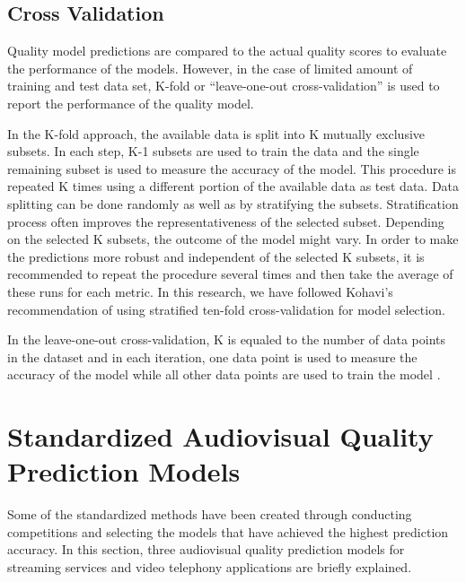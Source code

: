 \documentclass[journal]{IEEEtran}
\begin{document}
\subsection{Cross Validation}
\label{subsec:CrossVal}

Quality model predictions are compared to the actual quality scores to evaluate the performance of the models. However, in the case of limited amount of training and test data set, K-fold or ``leave-one-out cross-validation'' is used to report the performance of the quality model.

In the K-fold approach, the available data is split into K mutually exclusive subsets. In each step, K-1 subsets are used to train the data and the single remaining subset is used to measure the accuracy of the model. This procedure is repeated K times using a different portion of the available data as test data. Data splitting can be done randomly as well as by stratifying the subsets. Stratification process often improves the representativeness of the selected subset. Depending on the selected K subsets, the outcome of the model might vary. In order to make the predictions more robust and independent of the selected K subsets, it is recommended to repeat the procedure several times and then take the average of these runs for each metric. In this research, we have followed Kohavi's \cite{kohavi1995study} recommendation of using stratified ten-fold cross-validation for model selection.

In the leave-one-out cross-validation, K is equaled to the number of data points in the dataset and in each iteration, one data point is used to measure the accuracy of the model while all other data points are used to train the model \cite{kohavi1995study}.

\section{Standardized Audiovisual Quality Prediction Models}
\label{sec:Standardized}

Some of the standardized methods have been created through conducting competitions and selecting the models that have achieved the highest prediction accuracy. In this section, three audiovisual quality prediction models for streaming services and video telephony applications are briefly explained.
\end{document}
